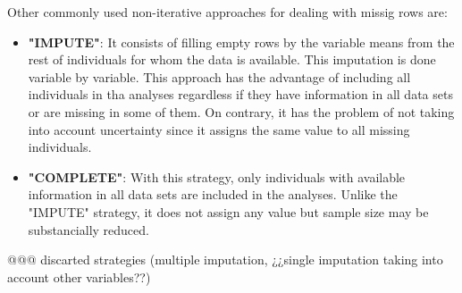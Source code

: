 \documentclass[article]{jss}
\begin{document}
Other commonly used non-iterative approaches for dealing with missig rows are:

\begin{itemize}

\item \textbf{"IMPUTE"}: It consists of filling empty rows by the variable means from the rest of individuals for whom the data is available. This imputation is done variable by variable. This approach has the advantage of including all individuals in tha analyses regardless if they have information in all data sets or are missing in some of them. On contrary, it has the problem of not taking into account uncertainty since it assigns the same value to all missing individuals.


\item \textbf{"COMPLETE"}: With this strategy, only individuals with available information in all data sets are included in the analyses. Unlike the "IMPUTE" strategy, it does not assign any value but sample size may be substancially reduced.

\end{itemize}


@@@ discarted strategies (multiple imputation, ¿¿single imputation taking into account other variables??)




\end{document}
